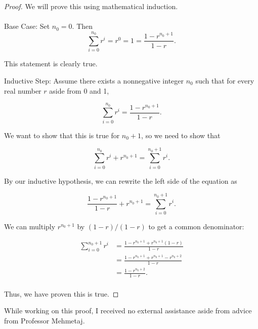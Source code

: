 \documentclass[12pt]{article}
\begin{document}
\begin{proof} We will prove this using mathematical induction. \\ \\

    Base Case: Set $n_0 = 0.$ Then $$\sum_{i=0}^{n_0} r^i = r^0 = 1 = \frac{1 - r^{n_0+1}}{1 - r}.$$

    This statement is clearly true.

    Inductive Step: Assume there exists a nonnegative integer $n_0$ such that for every real number $r$ aside from 0 and 1,

    $$\sum_{i=0}^{n_0} r^i = \frac{1 - r^{n_0+1}}{1 - r}.$$

    We want to show that this is true for $n_0+1$, so we need to show that

    $$\sum_{i=0}^{n_0} r^i + r^{n_0+1} = \sum_{i=0}^{n_0 + 1} r^i.$$

    By our inductive hypothesis, we can rewrite the left side of the equation as

    $$\frac{1 - r^{n_0+1}}{1 - r} + r^{n_0+1} = \sum_{i=0}^{n_0 + 1} r^i.$$

    We can multiply $r^{n_0+1}$ by $(1-r)/(1-r)$ to get a common denominator:

    \begin{align*}
        \sum_{i=0}^{n_0 + 1} r^i & = \frac{1 - r^{n_0+1} + r^{n_0+1}(1-r)}{1 - r} \\
        & = \frac{1 - r^{n_0+1} + r^{n_0+1} - r^{n_0+2}}{1 - r} \\
        & = \frac{1 - r^{n_0+2}}{1 - r}. \\
    \end{align*}

    Thus, we have proven this is true.

\end{proof}


\noindent While working on this proof, I received no external assistance aside from advice from Professor Mehmetaj.
\end{document}
